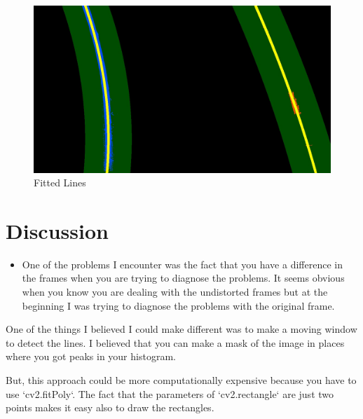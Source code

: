 \documentclass[11pt, a4paper]{article}
\begin{document}
\begin{figure}[htb!]
	\centering
	\includegraphics[width=0.8\linewidth]{fitted_lines}
	\caption{Fitted Lines}
	\label{fig:fitted_lines}
\end{figure}










\section{Discussion}
\label{sec:discussion}



\begin{itemize}
	\item One of the problems I encounter was the fact that you have a difference in the frames when you are trying to diagnose the problems. It seems obvious when you know you are dealing with the undistorted frames but at the beginning I was trying to diagnose the problems with the original frame.
\end{itemize}


One of the things I believed I could make different was to make a moving window to detect the lines. I believed that you can make a mask of the image in places where you got peaks in your histogram.

But, this approach could be more computationally expensive because you have to use `cv2.fitPoly`. The fact that the parameters of `cv2.rectangle` are just two points makes it easy also to draw the rectangles.
\end{document}
